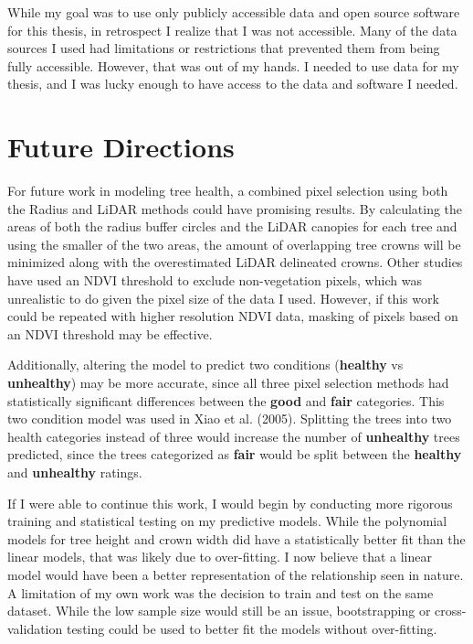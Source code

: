 \documentclass[12pt,twoside]{reedthesis}
\begin{document}
While my goal was to use only publicly accessible data and open source
software for this thesis, in retrospect I realize that I was not
accessible. Many of the data sources I used had limitations or
restrictions that prevented them from being fully accessible. However,
that was out of my hands. I needed to use data for my thesis, and I was
lucky enough to have access to the data and software I needed.

\hypertarget{future-directions}{%
\section{Future Directions}\label{future-directions}}

For future work in modeling tree health, a combined pixel selection
using both the Radius and LiDAR methods could have promising results. By
calculating the areas of both the radius buffer circles and the LiDAR
canopies for each tree and using the smaller of the two areas, the
amount of overlapping tree crowns will be minimized along with the
overestimated LiDAR delineated crowns. Other studies have used an NDVI
threshold to exclude non-vegetation pixels, which was unrealistic to do
given the pixel size of the data I used. However, if this work could be
repeated with higher resolution NDVI data, masking of pixels based on an
NDVI threshold may be effective.

Additionally, altering the model to predict two conditions (\textbf{healthy}
vs \textbf{unhealthy}) may be more accurate, since all three pixel selection
methods had statistically significant differences between the \textbf{good}
and \textbf{fair} categories. This two condition model was used in Xiao et al. (2005).
Splitting the trees into two health categories instead of three would
increase the number of \textbf{unhealthy} trees predicted, since the trees
categorized as \textbf{fair} would be split between the \textbf{healthy} and
\textbf{unhealthy} ratings.

If I were able to continue this work, I would begin by conducting more
rigorous training and statistical testing on my predictive models. While
the polynomial models for tree height and crown width did have a
statistically better fit than the linear models, that was likely due to
over-fitting. I now believe that a linear model would have been a better
representation of the relationship seen in nature. A limitation of my
own work was the decision to train and test on the same dataset. While
the low sample size would still be an issue, bootstrapping or
cross-validation testing could be used to better fit the models without
over-fitting.
\end{document}
